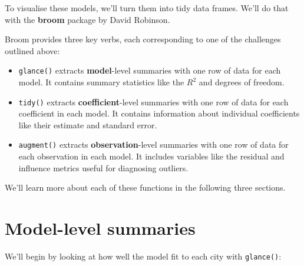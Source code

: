 To visualise these models, we'll turn them into tidy data frames. We'll
do that with the \textbf{broom} package by David Robinson. 
 

\begin{Shaded}
\begin{Highlighting}[]
\end{Highlighting}
\end{Shaded}

Broom provides three key verbs, each corresponding to one of the
challenges outlined above:

\begin{itemize}
\item
  \texttt{glance()} extracts \textbf{model}-level summaries with one row
  of data for each model. It contains summary statistics like the
  \(R^2\) and degrees of freedom.
\item
  \texttt{tidy()} extracts \textbf{coefficient}-level summaries with one
  row of data for each coefficient in each model. It contains
  information about individual coefficients like their estimate and
  standard error.
\item
  \texttt{augment()} extracts \textbf{observation}-level summaries with
  one row of data for each observation in each model. It includes
  variables like the residual and influence metrics useful for
  diagnosing outliers.
\end{itemize}

We'll learn more about each of these functions in the following three
sections.

\hypertarget{model-level-summaries}{%
\section{Model-level summaries}\label{model-level-summaries}}

We'll begin by looking at how well the model fit to each city with
\texttt{glance()}: 

